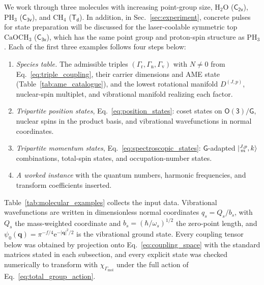 \documentclass[
  reprint,
  aps,
  prx,
  superscriptaddress,
  amsmath,
  amssymb,
  longbibliography
]{revtex4-2}
\newcommand{\grp}[1]{\mathsf{#1}}
\newcommand{\expe}{\mathrm{e}}
\newcommand{\irrJp}[2]{D^{(#1,#2)}}
\newcommand{\parity}{p}               %
\providecommand{\Gmol}{\Gamma_{\mathrm{mol}}}
\providecommand{\Grot}{\Gamma_{\mathrm{r}}}
\providecommand{\Gvib}{\Gamma_{\mathrm{v}}}
\providecommand{\Gspin}{\Gamma_{\mathrm{n}}}
\begin{document}
We work through three molecules with increasing point-group size, $\mathrm{H_2O}$ ($\grp{C_{2v}}$), $\mathrm{PH_3}$ ($\grp{C_{3v}}$), and $\mathrm{CH_4}$ ($\grp{T_{d}}$). In addition, in Sec.~\ref{sec:experiment}, concrete pulses for state preparation will be discussed for the laser-coolable symmetric top $\mathrm{CaOCH_3}$ ($\grp{C_{3v}}$), which has the same point group and proton-spin structure as $\mathrm{PH_3}$. Each of the first three examples follows four steps below:
\begin{enumerate}
\item \emph{Species table.} The admissible triples $(\Grot,\Gspin,\Gvib)$ with $N\neq0$ from Eq.~\eqref{eq:triple_coupling}, their carrier dimensions and AME state (Table~\ref{tab:ame_catalogue}), and the lowest rotational manifold $\irrJp{J}{\parity}$, nuclear-spin multiplet, and vibrational manifold realizing each factor.
\item \emph{Tripartite position states}, Eq.~\eqref{eq:position_states}: coset states on $\grp{O(3)}/\grp{G}$, nuclear spins in the product basis, and vibrational wavefunctions in normal coordinates.
\item \emph{Tripartite momentum states}, Eq.~\eqref{eq:spectroscopic_states}: $\grp{G}$-adapted $\ket{{}^{J,\parity}_{\,m},k}$ combinations, total-spin states, and occupation-number states.
\item \emph{A worked instance} with the quantum numbers, harmonic frequencies, and transform coefficients inserted.
\end{enumerate}
Table~\ref{tab:molecular_examples} collects the input data. Vibrational wavefunctions are written in dimensionless normal coordinates $q_s=Q_s/b_s$, with $Q_s$ the mass-weighted coordinate and $b_s=(\hbar/\omega_s)^{1/2}$ the zero-point length, and $\psi_0(\mathbf q)=\pi^{-f/4}\expe^{-|\mathbf q|^2/2}$ is the vibrational ground state. Every coupling tensor below was obtained by projection onto Eq.~\eqref{eq:coupling_space} with the standard matrices stated in each subsection, and every explicit state was checked numerically to transform with $\chi_{\Gmol}$ under the full action of Eq.~\eqref{eq:total_group_action}.
\end{document}
